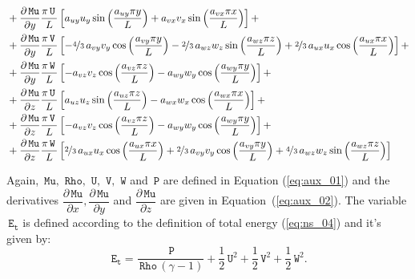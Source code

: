 \documentclass[10pt]{article}
\newcommand{\diff}[2] {\dfrac{\partial #1}{\partial #2}}
\newcommand{\Rho}{\,\mathtt{Rho}}
\newcommand{\PP}{\,\mathtt{P}}
\newcommand{\U}{\,\mathtt{U}}
\newcommand{\V}{\,\mathtt{V}}
\newcommand{\W}{\,\mathtt{W}}
\newcommand{\Mu}{\,\mathtt{Mu}}
\newcommand{\DMuDx}{\diff{\Mu}{x}}
\newcommand{\DMuDy}{\diff{\Mu}{y}}
\newcommand{\DMuDz}{\diff{\Mu}{z}}
\newcommand{\Et}{\,\mathtt{E_t}}
\begin{document}
%
%
\begin{equation*}
 \begin{split}
&+ \DMuDy\frac{\pi \U \, }{L} \left[a_{uy} u_{y} \sin\left(\frac{a_{uy} \pi y}{L}\right) + a_{vx} v_{x} \sin\left(\frac{a_{vx} \pi x}{L}\right)\right] + \\ 
&+ \DMuDy\frac{\pi \V \, }{L} \left[- \nicefrac{4}{3} \, a_{vy} v_{y} \cos\left(\frac{a_{vy} \pi y}{L}\right) - \nicefrac{2}{3} \, a_{wz} w_{z} \sin\left(\frac{a_{wz} \pi z}{L}\right) + \nicefrac{2}{3} \, a_{ux} u_{x} \cos\left(\frac{a_{ux} \pi x}{L}\right)\right] + \\ 
&+ \DMuDy\frac{\pi \W \, }{L} \left[- a_{vz} v_{z} \cos\left(\frac{a_{vz} \pi z}{L}\right) - a_{wy} w_{y} \cos\left(\frac{a_{wy} \pi y}{L}\right)\right] + \\ 
&+ \DMuDz\frac{\pi \U \, }{L} \left[a_{uz} u_{z} \sin\left(\frac{a_{uz} \pi z}{L}\right) - a_{wx} w_{x} \cos\left(\frac{a_{wx} \pi x}{L}\right)\right] + \\ 
&+ \DMuDz\frac{\pi \V \, }{L} \left[- a_{vz} v_{z} \cos\left(\frac{a_{vz} \pi z}{L}\right) - a_{wy} w_{y} \cos\left(\frac{a_{wy} \pi y}{L}\right)\right] + \\ 
&+ \DMuDz\frac{\pi \W \, }{L} \left[\nicefrac{2}{3} \, a_{ux} u_{x} \cos\left(\frac{a_{ux} \pi x}{L}\right) + \nicefrac{2}{3} \, a_{vy} v_{y} \cos\left(\frac{a_{vy} \pi y}{L}\right) + \nicefrac{4}{3} \, a_{wz} w_{z} \sin\left(\frac{a_{wz} \pi z}{L}\right)\right]
 \end{split}
\end{equation*}

Again, $\Mu,\, \Rho,\,\U,\,\V,\,\W$ and $\PP$ are defined in Equation (\ref{eq:aux_01}) and the derivatives $\DMuDx,\DMuDy$ and $\DMuDz$ are given in Equation~(\ref{eq:aux_02}). The variable $\Et$ is defined according to the definition of total energy (\ref{eq:ns_04}) and it's given by:
$$\Et= \frac{\PP}{\Rho \, \left(\gamma-1\right)} + \frac{1}{2} \U^{2} + \frac{1}{2} \V^{2} + \frac{1}{2} \W^{2}.$$
\end{document}
